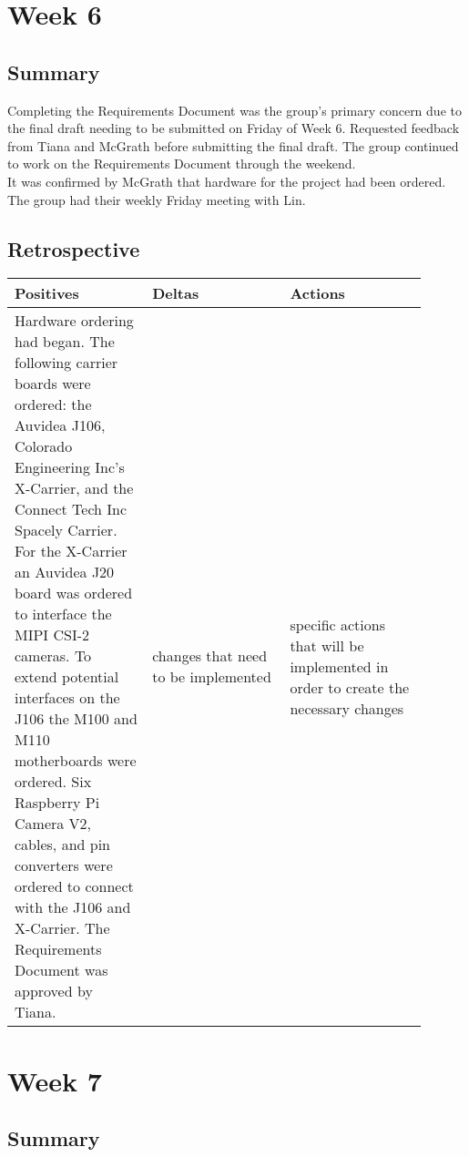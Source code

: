 \documentclass[letterpaper,10pt,serif,draftclsnofoot,onecolumn,compsoc,titlepage]{IEEEtran}
\begin{document}
\section{Week 6}

\subsection{Summary}

Completing the Requirements Document was the group's primary concern due to the 
final draft needing to be submitted on Friday of Week 6. Requested feedback 
from Tiana and McGrath before submitting the final draft. The group continued to 
work on the Requirements Document through the weekend. \\

It was confirmed by McGrath that hardware for the project had been ordered. The group 
had their weekly Friday meeting with Lin. \\

\subsection{Retrospective}

\begin{tabular}{|p{0.3\linewidth}|p{0.3\linewidth}|p{0.3\linewidth}|}
   \hline
   \textbf{Positives} & \textbf{Deltas} & \textbf{Actions}\\ 
   \hline
   Hardware ordering had began. The following carrier boards were ordered: the Auvidea 
   J106, Colorado Engineering Inc's X-Carrier, and the Connect Tech Inc Spacely Carrier. 
   For the X-Carrier an Auvidea J20 board was ordered to interface the MIPI CSI-2 
   cameras. To extend potential interfaces on the J106 the M100 and M110 motherboards 
   were ordered. Six Raspberry Pi Camera V2, cables, and pin converters were ordered 
   to connect with the J106 and X-Carrier. The Requirements Document was approved by 
   Tiana.
   & 
   changes that need to be implemented 
   & 
   specific actions that will be implemented in order to create the necessary 
   changes \\
   \hline
\end{tabular}

\section{Week 7}

\subsection{Summary}
\end{document}

